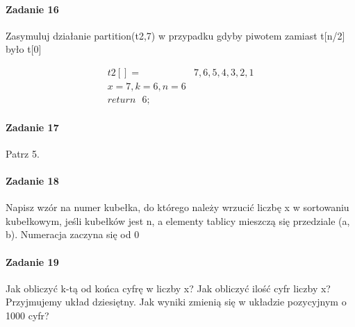 \documentclass[18pt]{extarticle}
\begin{document}
\paragraph{Zadanie 16} Zasymuluj działanie partition(t2,7) w przypadku gdyby piwotem zamiast t[n/2] było t[0]

\begin{align*}
    t2[]=&{7,6,5,4,3,2,1} \\
    x=7, k=6, n=6& \\
    return\text{ }6;
\end{align*}

\paragraph{Zadanie 17} Patrz 5.

\paragraph{Zadanie 18} Napisz wzór na numer kubełka, do którego należy wrzucić liczbę x w sortowaniu kubełkowym, jeśli kubełków jest n, a elementy tablicy mieszczą się przedziale (a, b). Numeracja zaczyna się od 0

\paragraph{Zadanie 19} Jak obliczyć k-tą od końca cyfrę w liczby x? Jak obliczyć ilość cyfr liczby x? Przyjmujemy układ dziesiętny. Jak wyniki zmienią się w układzie pozycyjnym o 1000 cyfr?
\end{document}
